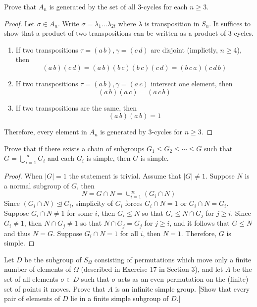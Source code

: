\documentclass{article}
\newenvironment{problem}[2][Problem]{\begin{trivlist}
\item[\hskip \labelsep {\bfseries #1}\hskip \labelsep {\bfseries #2.}]}{\end{trivlist}}
\begin{document}
\begin{problem}{4}
        Prove that $A_n$ is generated by the set of all 3-cycles for each $n \geq 3$.
\end{problem}
\begin{proof}
    Let $\sigma \in A_n$. Write $\sigma = \lambda_1 \dots \lambda_{2t}$ where $\lambda$ is transposition in $S_n$. It suffices to show that a product of two transpositions can be written as 
    a product of $3$-cycles.
    \begin{enumerate}[1.]
        \item If two transpositions $\tau=(a\, b), \gamma =(c\, d)$ are disjoint (implictly, $n\geq 4$), then 
        \[
            (a\, b)(c\, d)=(a\, b)(b\, c)(b\, c)(c\, d)=(b\, c\, a)(c\, d\, b)
        \]
        \item If two transpositions $\tau=(a\, b), \gamma =(a\, c)$ intersect one element, then 
        \[
            (a\, b)(a\, c)=(a\, c\, b)
        \]
        \item If two transpositions are the same, then
        \[
            (a\, b)(a\, b)=1
        \]
    \end{enumerate}
    Therefore, every element in $A_n$ is generated by $3$-cycles for $n\geq 3$.
\end{proof}
\begin{problem}{5}
        Prove that if there exists a chain of subgroups $G_1 \leq G_2 \leq \cdots \leq G$ such that $G = \bigcup_{i=1}^{\infty} G_i$ and each $G_i$ is simple, then $G$ is simple.
\end{problem}
\begin{proof}
    When $|G|=1$ the statement is trivial. Assume that $|G|\neq 1$. Suppose $N$ is a normal subgroup of $G$, then 
    \[
        N=G\cap N = \cup_{i=1}^\infty (G_i\cap N)
    \]
    Since $(G_i\cap N) \trianglelefteq  G_i$, simplicity of $G_i$ forces $G_i\cap N=1$ or $G_i\cap N=G_i$. Suppose $G_i\cap N\neq 1$ for some $i$, then $G_i\leq N$ so that $G_i\leq N\cap G_j$ for $j\geq i$. Since $G_i\neq 1$, then $N\cap G_j\neq 1$ so that $N\cap G_j=G_j$ for $j\geq i$, and it follows that $G\leq N$ and thus $N=G$. Suppose $G_i\cap N=1$ for all $i$, then $N=1$. Therefore, $G$ is simple.
\end{proof}
\begin{problem}{6}
         Let $D$ be the subgroup of $S_\Omega$ consisting of permutations which move only a finite number of elements of $\Omega$ (described in Exercise 17 in Section 3), and let $A$ be the set of all elements $\sigma \in D$ such that $\sigma$ acts as an even permutation on the (finite) set of points it moves. 
    Prove that $A$ is an infinite simple group. 
    [Show that every pair of elements of $D$ lie in a finite simple subgroup of $D$.]
\end{problem}
\end{document}

